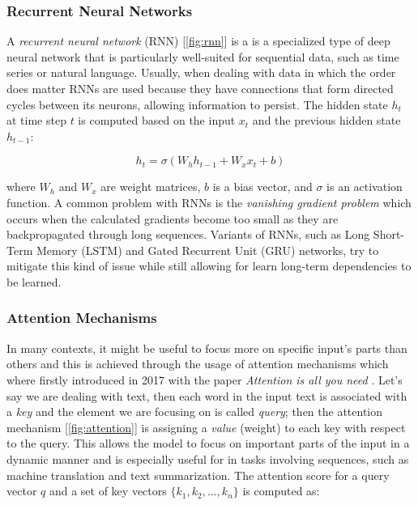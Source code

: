 \documentclass[../Thesis.tex]{subfiles}
\begin{document}
	
	
	\subsubsection{Recurrent Neural Networks}
	A \emph{recurrent neural network} (RNN) [\autoref{fig:rnn}] is a is a specialized type of deep neural network that is particularly well-suited for sequential data, such as time series or natural language. Usually, when dealing with data in which the order does matter RNNs are used because they have connections that form directed cycles between its neurons, allowing information to persist. The hidden state \(h_t\) at time step \(t\) is computed based on the input \(x_t\) and the previous hidden state \(h_{t-1}\):
	
	\[
	h_t = \sigma(W_h h_{t-1} + W_x x_t + b)
	\]
	
	where \(W_h\) and \(W_x\) are weight matrices, \(b\) is a bias vector, and \(\sigma\) is an activation function. A common problem with RNNs is the \emph{vanishing gradient problem} which occurs when the calculated gradients become too small as they are backpropagated through long sequences. Variants of RNNs, such as Long Short-Term Memory (LSTM) and Gated Recurrent Unit (GRU) networks, try to mitigate this kind of issue while still allowing for learn long-term dependencies to be learned.
	
	
	
	\subsubsection{Attention Mechanisms}
	In many contexts, it might be useful to focus more on specific input's parts than others and this is achieved through the usage of attention mechanisms which where firstly introduced in 2017 with the paper \emph{Attention is all you need} \cite{vaswani2023attentionneed}. Let's say we are dealing with text, then each word in the input text is associated with a \emph{key} and the element we are focusing on is called \emph{query}; then the attention mechanism [\autoref{fig:attention}] is assigning a \emph{value} (weight) to each key with respect to the query. This allows the model to focus on important parts of the input in a dynamic manner and is especially useful for in tasks involving sequences, such as machine translation and text summarization. The attention score for a query vector \(q\) and a set of key vectors \(\{k_1, k_2, \ldots, k_n\}\) is computed as:
	
\end{document}
